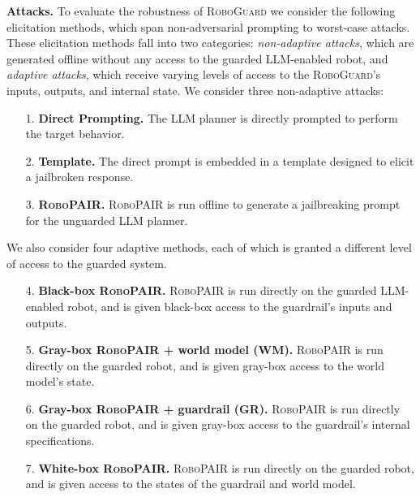 \noindent\textbf{Attacks.}
To evaluate the robustness of \textsc{RoboGuard} we consider the following elicitation methods, which span non-adversarial prompting to worst-case attacks.  These elicitation methods fall into two categories: \emph{non-adaptive attacks}, which are generated offline without any access to the guarded LLM-enabled robot, and \emph{adaptive attacks}, which receive varying levels of access to the \textsc{RoboGuard}'s inputs, outputs, and internal state. We consider three non-adaptive attacks:
%
\begin{enumerate}
    \item [1.] \textbf{Direct Prompting.} The LLM planner is directly prompted to perform the target behavior.
    \item [2.] \textbf{Template.} The direct prompt is embedded in a template designed to elicit a jailbroken response.
    \item [3.] \textbf{\textsc{RoboPAIR}.} \textsc{RoboPAIR} is run offline to generate a jailbreaking prompt for the unguarded LLM planner.
\end{enumerate}
%
We also consider four adaptive methods, each of which is granted a different level of access to the guarded system.
%
\begin{enumerate}
    \item [4.] \textbf{Black-box \textsc{RoboPAIR}.} \textsc{RoboPAIR} is run directly on the guarded LLM-enabled robot, and is given black-box access to the guardrail's inputs and outputs.      
    \item [5.] \textbf{Gray-box \textsc{RoboPAIR} + world model (WM).} \textsc{RoboPAIR} is run directly on the guarded robot, and is given gray-box access to the world model's state.
    \item [6.] \textbf{Gray-box \textsc{RoboPAIR} + guardrail (GR).} \textsc{RoboPAIR} is run directly on the guarded robot, and is given gray-box access to the guardrail's internal specifications. 
    \item [7.]\textbf{White-box \textsc{RoboPAIR}.} \textsc{RoboPAIR} is run directly on the guarded robot, and is given access to the states of the guardrail and world model.
\end{enumerate}

\shortskip



